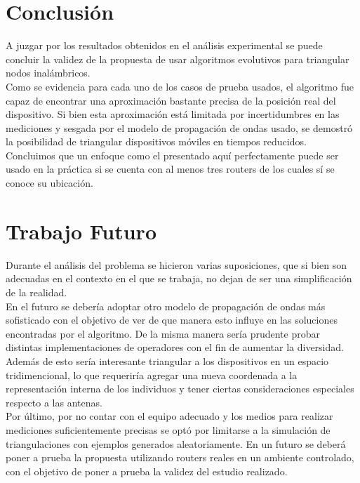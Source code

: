 \documentclass[journal]{IEEEtran}
\begin{document}
\section{Conclusión}

A juzgar por los resultados obtenidos en el análisis experimental se puede concluir la validez de la propuesta de usar algoritmos evolutivos para triangular nodos inalámbricos.\\

Como se evidencia para cada uno de los casos de prueba usados, el algoritmo fue capaz de encontrar una aproximación bastante precisa de la posición real del dispositivo. Si bien esta aproximación está limitada por incertidumbres en las mediciones y sesgada por el modelo de propagación de ondas usado, se demostró la posibilidad de triangular dispositivos móviles en tiempos reducidos.\\

Concluimos que un enfoque como el presentado aquí perfectamente puede ser usado en la práctica si se cuenta con al menos tres routers de los cuales sí se conoce su ubicación.\\

\section{Trabajo Futuro}

Durante el análisis del problema se hicieron varias suposiciones, que si bien son adecuadas en el contexto en el que se trabaja, no dejan de ser una simplificación de la realidad.\\

En el futuro se debería adoptar otro modelo de propagación de ondas más sofisticado con el objetivo de ver de que manera esto influye en las soluciones encontradas por el algoritmo. De la misma manera sería prudente probar distintas implementaciones de operadores con el fin de aumentar la diversidad.\\

Además de esto sería interesante triangular a los dispositivos en un espacio tridimencional, lo que requeriría agregar una nueva coordenada a la representación interna de los individuos y tener ciertas consideraciones especiales respecto a las antenas.\\

Por último, por no contar con el equipo adecuado y los medios para realizar mediciones suficientemente precisas se optó por limitarse a la simulación de triangulaciones con ejemplos generados aleatoriamente. En un futuro se deberá poner a prueba la propuesta utilizando routers reales en un ambiente controlado, con el objetivo de poner a prueba la validez del estudio realizado.\\
\end{document}

